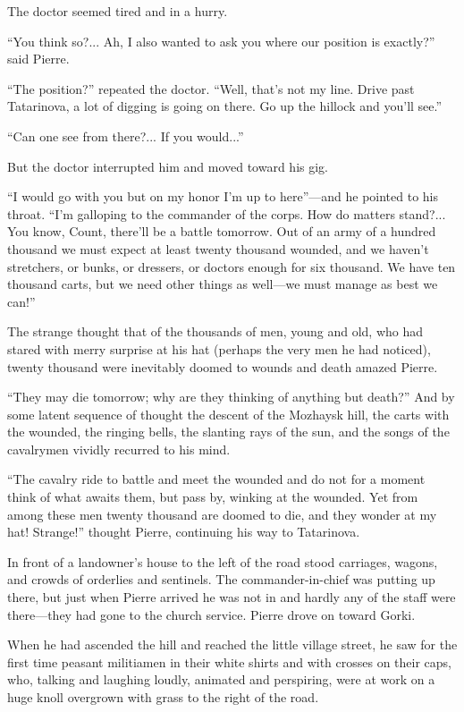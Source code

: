 The doctor seemed tired and in a hurry.

``You think so?... Ah, I also wanted to ask you where our
position is exactly?'' said Pierre.

``The position?'' repeated the doctor. ``Well, that's not my
line. Drive past Tatarinova, a lot of digging is going on
there. Go up the hillock and you'll see.''

``Can one see from there?... If you would...''

But the doctor interrupted him and moved toward his gig.

``I would go with you but on my honor I'm up to here''---and he
pointed to his throat. ``I'm galloping to the commander of the
corps. How do matters stand?... You know, Count, there'll be a
battle tomorrow. Out of an army of a hundred thousand we must
expect at least twenty thousand wounded, and we haven't
stretchers, or bunks, or dressers, or doctors enough for six
thousand. We have ten thousand carts, but we need other things as
well---we must manage as best we can!''

The strange thought that of the thousands of men, young and old,
who had stared with merry surprise at his hat (perhaps the very
men he had noticed), twenty thousand were inevitably doomed to
wounds and death amazed Pierre.

``They may die tomorrow; why are they thinking of anything but
death?''  And by some latent sequence of thought the descent of
the Mozhaysk hill, the carts with the wounded, the ringing bells,
the slanting rays of the sun, and the songs of the cavalrymen
vividly recurred to his mind.

``The cavalry ride to battle and meet the wounded and do not for
a moment think of what awaits them, but pass by, winking at the
wounded. Yet from among these men twenty thousand are doomed to
die, and they wonder at my hat! Strange!'' thought Pierre,
continuing his way to Tatarinova.

In front of a landowner's house to the left of the road stood
carriages, wagons, and crowds of orderlies and sentinels. The
commander-in-chief was putting up there, but just when Pierre
arrived he was not in and hardly any of the staff were
there---they had gone to the church service.  Pierre drove on
toward Gorki.

When he had ascended the hill and reached the little village
street, he saw for the first time peasant militiamen in their
white shirts and with crosses on their caps, who, talking and
laughing loudly, animated and perspiring, were at work on a huge
knoll overgrown with grass to the right of the road.

